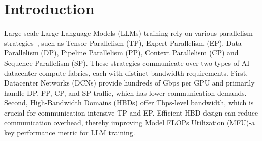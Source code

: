\section{Introduction}


Large-scale Large Language Models (LLMs) training rely on various parallelism strategies~\cite{megatrontrain3DP,zero}, such as Tensor Parallelism (TP), Expert Parallelism (EP), Data Parallelism (DP), Pipeline Parallelism (PP), Context Parallelism (CP) and Sequence Parallelism (SP). These strategies communicate over two types of AI datacenter compute fabrics, each with distinct bandwidth requirements. First, Datacenter Networks (DCNs) provide hundreds of Gbps per GPU and primarily handle DP, PP, CP, and SP traffic, which has lower communication demands. Second, High-Bandwidth Domains (HBDs) offer Tbps-level bandwidth, which is crucial for communication-intensive TP and EP. Efficient HBD design can reduce communication overhead, thereby improving Model FLOPs Utilization (MFU)-a key performance metric for LLM training.



